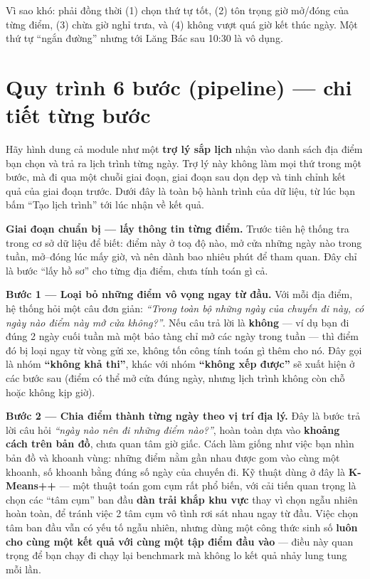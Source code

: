 \documentclass[12pt,a4paper]{article}
\begin{document}
Vì sao khó: phải đồng thời (1) chọn thứ tự tốt, (2) tôn trọng giờ mở/đóng của
từng điểm, (3) chừa giờ nghỉ trưa, và (4) không vượt quá giờ kết thúc ngày. Một
thứ tự ``ngắn đường'' nhưng tới Lăng Bác sau 10:30 là vô dụng.

\section{Quy trình 6 bước (pipeline) --- chi tiết từng bước}

Hãy hình dung cả module như một \textbf{trợ lý sắp lịch} nhận vào danh sách
địa điểm bạn chọn và trả ra lịch trình từng ngày. Trợ lý này không làm mọi thứ
trong một bước, mà đi qua một chuỗi giai đoạn, giai đoạn sau dọn dẹp và tinh
chỉnh kết quả của giai đoạn trước. Dưới đây là toàn bộ hành trình của dữ liệu,
từ lúc bạn bấm ``Tạo lịch trình'' tới lúc nhận về kết quả.

\textbf{Giai đoạn chuẩn bị --- lấy thông tin từng điểm.} Trước tiên hệ thống
tra trong cơ sở dữ liệu để biết: điểm này ở toạ độ nào, mở cửa những ngày nào
trong tuần, mở--đóng lúc mấy giờ, và nên dành bao nhiêu phút để tham quan. Đây
chỉ là bước ``lấy hồ sơ'' cho từng địa điểm, chưa tính toán gì cả.

\textbf{Bước 1 --- Loại bỏ những điểm vô vọng ngay từ đầu.} Với mỗi địa điểm,
hệ thống hỏi một câu đơn giản: \textit{``Trong toàn bộ những ngày của chuyến đi
này, có ngày nào điểm này mở cửa không?''}. Nếu câu trả lời là \textbf{không}
--- ví dụ bạn đi đúng 2 ngày cuối tuần mà một bảo tàng chỉ mở các ngày trong
tuần --- thì điểm đó bị loại ngay từ vòng gửi xe, không tốn công tính toán gì
thêm cho nó. Đây gọi là nhóm \textbf{``không khả thi''}, khác với nhóm
\textbf{``không xếp được''} sẽ xuất hiện ở các bước sau (điểm có thể mở cửa
đúng ngày, nhưng lịch trình không còn chỗ hoặc không kịp giờ).

\textbf{Bước 2 --- Chia điểm thành từng ngày theo vị trí địa lý.} Đây là bước
trả lời câu hỏi \textit{``ngày nào nên đi những điểm nào?''}, hoàn toàn dựa vào
\textbf{khoảng cách trên bản đồ}, chưa quan tâm giờ giấc. Cách làm giống như
việc bạn nhìn bản đồ và khoanh vùng: những điểm nằm gần nhau được gom vào cùng
một khoanh, số khoanh bằng đúng số ngày của chuyến đi. Kỹ thuật dùng ở đây là
\textbf{K-Means++} --- một thuật toán gom cụm rất phổ biến, với cải tiến quan
trọng là chọn các ``tâm cụm'' ban đầu \textbf{dàn trải khắp khu vực} thay vì
chọn ngẫu nhiên hoàn toàn, để tránh việc 2 tâm cụm vô tình rơi sát nhau ngay từ
đầu. Việc chọn tâm ban đầu vẫn có yếu tố ngẫu nhiên, nhưng dùng một công thức
sinh số \textbf{luôn cho cùng một kết quả với cùng một tập điểm đầu vào} ---
điều này quan trọng để bạn chạy đi chạy lại benchmark mà không lo kết quả nhảy
lung tung mỗi lần.
\end{document}
